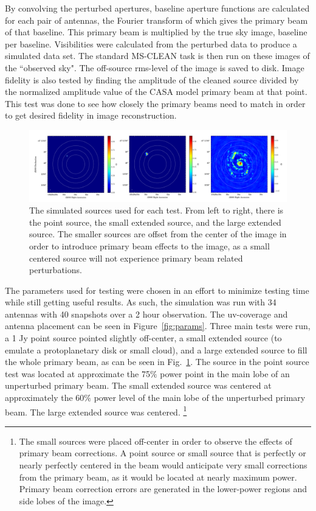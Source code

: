 \documentclass[11pt]{article}
\begin{document}
By convolving the perturbed apertures, baseline aperture functions are 
calculated for each pair of antennas, the Fourier transform of which gives the 
primary beam of that baseline. This primary beam is multiplied by the true sky 
image, baseline per baseline. Visibilities were calculated from the perturbed 
data to produce a simulated data set. The standard MS-CLEAN task is then run on 
these images of the ``observed sky". The off-source rms-level of the image is 
saved to disk.  Image fidelity is also tested by finding the amplitude of the 
cleaned source divided by the normalized amplitude value of the CASA model 
primary beam at that point.  This test was done to see how closely the primary 
beams need to match in order to get desired fidelity in image reconstruction.

\begin{figure}
    \centering
    \includegraphics[width=6.5in]{images/fits/all-sources.png}
    \caption{
        The simulated sources used for each test. From left to right, there is 
        the point source, the small extended source, and the large extended 
        source. The smaller sources are offset from the center of the image in 
        order to introduce primary beam effects to the image, as a small 
        centered source will not experience primary beam related perturbations.  
       }
    \label{fig:sources}
\end{figure}

The parameters used for testing were chosen in an effort to minimize testing
time while still getting useful results. As such, the simulation was run
with 34 antennas with 40 snapshots over a 2 hour observation. The uv-coverage
and antenna placement can be seen in Figure~\ref{fig:params}. Three main tests
were run, a 1 Jy point source pointed slightly off-center, a small extended 
source (to emulate a protoplanetary disk or small cloud), and a large extended 
source to fill the whole primary beam, as can be seen in 
Fig.~\ref{fig:sources}.  The source in the point source test was
located at approximate the 75$\%$ power point in the main lobe of an 
unperturbed primary beam. The small extended source was centered at 
approximately the 60$\%$ power level of the main lobe of the unperturbed 
primary beam. The large extended source was centered. \footnote{The small 
 sources were placed off-center in order to observe the effects of primary beam 
 corrections. A point source or small source that is perfectly or nearly 
 perfectly centered in the beam would anticipate very small corrections from 
the primary beam, as it would be located at nearly maximum power.  Primary beam 
correction errors are generated in the lower-power regions and side lobes of 
the image.}
\end{document}
